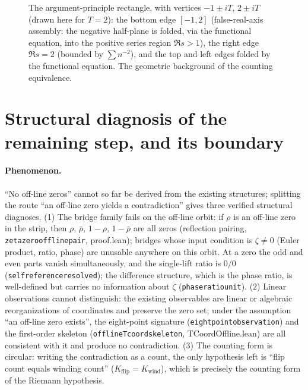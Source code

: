 \documentclass{article}
\renewcommand{\_}{\underscoreOrig\allowbreak}
\newcommand{\GG}{\Gamma}
\newcommand{\zt}{\zeta}
\begin{document}
\begin{figure}[h]
\centering
{}
\caption{The argument-principle rectangle, with vertices $-1\pm iT$,
$2\pm iT$ (drawn here for $T=2$): the bottom edge $[-1,2]$ (false-real-axis
assembly: the negative half-plane is folded, via the functional equation,
into the positive series region $\Re s>1$), the right edge $\Re s=2$
(bounded by $\sum n^{-2}$), and the top and left edges folded by the
functional equation. The geometric background of the counting
equivalence.}
\label{fig:rect}
\end{figure}

\section{Structural diagnosis of the remaining step, and its boundary}
\label{sec:diag}

\paragraph{Phenomenon.} ``No off-line zeros'' cannot so far be derived
from the existing structures; splitting the route ``an off-line zero
yields a contradiction'' gives three verified structural diagnoses.
(1) The bridge family fails on the off-line orbit: if $\rho$ is an
off-line zero in the strip, then $\rho$, $\bar\rho$, $1-\rho$,
$1-\bar\rho$ are all zeros (reflection pairing,
\texttt{zeta\_zero\_offline\_pair}, proof.lean); bridges whose input
condition is $\zt\ne0$ (Euler product, ratio, phase) are unusable
anywhere on this orbit. At a zero the odd and even parts vanish
simultaneously, and the single-lift ratio is $0/0$
(\texttt{self\_reference\_resolved}); the difference structure, which is
the phase ratio, is well-defined but carries no information about $\zt$
(\texttt{phase\_ratio\_unit}).
(2) Linear observations cannot distinguish: the existing observables are
linear or algebraic reorganizations of coordinates and preserve the zero
set; under the assumption ``an off-line zero exists'', the eight-point
signature (\texttt{eight\_point\_observation}) and the first-order
skeleton (\texttt{offline\_T\_coord\_skeleton}, TCoordOffline.lean) are
all consistent with it and produce no contradiction.
(3) The counting form is circular: writing the contradiction as a count,
the only hypothesis left is ``flip count equals winding count''
($K_{\mathrm{flip}}=K_{\mathrm{wind}}$), which is precisely the counting
form of the Riemann hypothesis.
\end{document}
